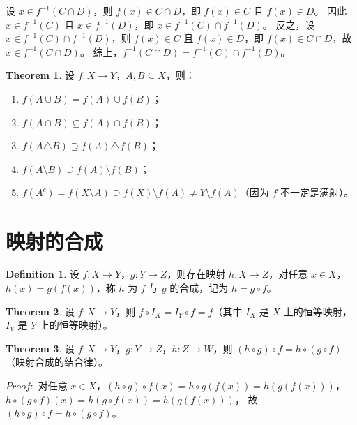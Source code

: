 \documentclass[oneside]{book}
\theoremstyle{definition}
\newtheorem{definition}{Definition}[section]
\newtheorem{theorem}{Theorem}[section]
\begin{document}
		设 \( x \in f^{-1}(C \cap D) \)，则 \( f(x) \in C \cap D \)，即 \( f(x) \in C \) 且 \( f(x) \in D \)。
		因此 \( x \in f^{-1}(C) \) 且 \( x \in f^{-1}(D) \)，即 \( x \in f^{-1}(C) \cap f^{-1}(D) \)。
		反之，设 \( x \in f^{-1}(C) \cap f^{-1}(D) \)，则 \( f(x) \in C \) 且 \( f(x) \in D \)，即 \( f(x) \in C \cap D \)，故 \( x \in f^{-1}(C \cap D) \)。
		综上，\( f^{-1}(C \cap D) = f^{-1}(C) \cap f^{-1}(D) \)。
	\begin{theorem}
		设 \( f: X \to Y \)，\( A, B \subseteq X \)，则：
		\begin{enumerate}
			\item \( f(A \cup B) = f(A) \cup f(B) \)；
			\item \( f(A \cap B) \subseteq f(A) \cap f(B) \)；
			\item \( f(A \triangle B) \supseteq f(A) \triangle f(B) \)；
			\item \( f(A \setminus B) \supseteq f(A) \setminus f(B) \)；
			\item \( f(A^c) = f(X \setminus A) \supseteq f(X) \setminus f(A) \neq Y \setminus f(A)\)（因为 \( f \) 不一定是满射）。
		\end{enumerate}
	\end{theorem}
	
	\section{映射的合成}
	\begin{definition}
		设 \( f: X \to Y \)，\( g: Y \to Z \)，则存在映射 \( h: X \to Z \)，对任意 \( x \in X \)，\( h(x) = g(f(x)) \)，称 \( h \) 为 \( f \) 与 \( g \) 的合成，记为 \( h = g \circ f \)。
	\end{definition}
	
	\begin{theorem}
		设 \( f: X \to Y \)，则 \( f \circ I_X = I_Y \circ f = f \)（其中 \( I_X \) 是 \( X \) 上的恒等映射，\( I_Y \) 是 \( Y \) 上的恒等映射）。
	\end{theorem}
	
	\begin{theorem}
		设 \( f: X \to Y \)，\( g: Y \to Z \)，\( h: Z \to W \)，则 \( (h \circ g) \circ f = h \circ (g \circ f) \)（映射合成的结合律）。
	\end{theorem}
	
	$Proof:$
		对任意 \( x \in X \)，\( (h \circ g) \circ f (x) = h \circ g (f(x)) = h(g(f(x))) \)，
		\( h \circ (g \circ f) (x) = h(g \circ f (x)) = h(g(f(x))) \)，
		故 \( (h \circ g) \circ f = h \circ (g \circ f) \)。
	
\end{document}
